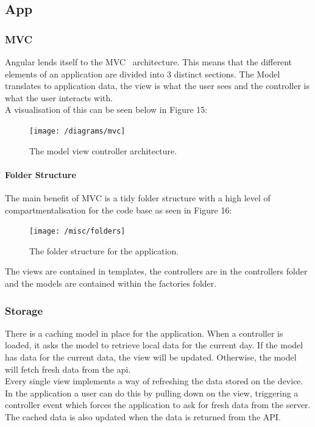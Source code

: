 \documentclass[draft,preprint,12pt,3p]{elsarticle}
\begin{document}
\subsection{App}
\subsubsection{MVC}
Angular lends itself to the MVC~\cite{mvc} architecture. This means that the different elements of an application are divided into 3 distinct sections. The Model translates to application data, the view is what the user sees and the controller is what the user interacts with.\\

A visualisation of this can be seen below in Figure 15:
\begin{figure}[H]
    \centering
    \texttt{[image: /diagrams/mvc]}
    \caption {The model view controller architecture.~\cite{mvcimage}}
\end{figure}

\paragraph{Folder Structure}
The main benefit of MVC is a tidy folder structure with a high level of compartmentalisation for the code base as seen in Figure 16:

\begin{figure}[H]
    \centering
    \texttt{[image: /misc/folders]}
    \caption {The folder structure for the application.}
\end{figure}
The views are contained in templates, the controllers are in the controllers folder and the models are contained within the factories folder.\\

\subsubsection{Storage}
There is a caching model in place for the application. When a controller is loaded, it asks the model to retrieve local data for the current day. If the model has data for the current data, the view will be updated. Otherwise, the model will fetch fresh data from the api.\\
Every single view implements a way of refreshing the data stored on the device. In the application a user can do this by pulling down on the view, triggering a controller event which forces the application to ask for fresh data from the server. The cached data is also updated when the data is returned from the API.
\end{document}
